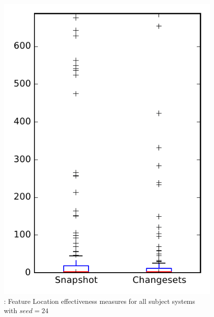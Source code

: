 
\begin{figure}
\centering
\includegraphics[height=0.4\textheight]{figures/flt_seed/rq1_overview_24}
\caption{\rone: Feature Location effectiveness measures for all subject systems with $seed=24$}
\label{fig:flt_seed:rq1:overview}
\end{figure}

